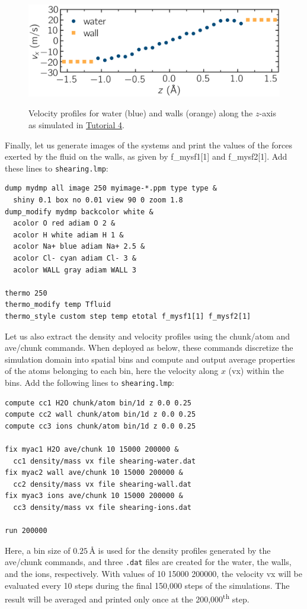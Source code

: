 \documentclass[9pt,tutorial]{livecoms}
\newcommand{\lmpcmd}[1]{\colorbox{listing}{\textcolor{command}{\small{#1}}}} %
\newcommand{\flecmd}[1]{\textcolor{command}{\texttt{#1}}} %
\begin{document}
\begin{figure}
\centering
\includegraphics[width=\linewidth]{NANOSHEAR-profiles}\\[-2ex]
\caption{Velocity profiles for water (blue) and walls (orange) along the $z$-axis as
simulated in \hyperref[sheared-confined-label]{Tutorial 4}.}
\label{fig:NANOSHEAR-profiles}
\end{figure}

Finally, let us generate images of the systems and print the values of the
forces exerted by the fluid on the walls, as given by \lmpcmd{f\_mysf1[1]}
and \lmpcmd{f\_mysf2[1]}.  Add these lines to \flecmd{shearing.lmp}:
\begin{lstlisting}
dump mydmp all image 250 myimage-*.ppm type type &
  shiny 0.1 box no 0.01 view 90 0 zoom 1.8
dump_modify mydmp backcolor white &
  acolor O red adiam O 2 &
  acolor H white adiam H 1 &
  acolor Na+ blue adiam Na+ 2.5 &
  acolor Cl- cyan adiam Cl- 3 &
  acolor WALL gray adiam WALL 3

thermo 250
thermo_modify temp Tfluid
thermo_style custom step temp etotal f_mysf1[1] f_mysf2[1]
\end{lstlisting}
Let us also extract the density and velocity profiles using
the \lmpcmd{chunk/atom} and \lmpcmd{ave/chunk} commands.  When deployed as below, these
commands discretize the simulation domain into spatial bins and compute and output
average properties of the atoms belonging to each bin, here the velocity
along $x$ (\lmpcmd{vx}) within the bins.  Add the following lines to \flecmd{shearing.lmp}:
\begin{lstlisting}
compute cc1 H2O chunk/atom bin/1d z 0.0 0.25
compute cc2 wall chunk/atom bin/1d z 0.0 0.25
compute cc3 ions chunk/atom bin/1d z 0.0 0.25

fix myac1 H2O ave/chunk 10 15000 200000 &
  cc1 density/mass vx file shearing-water.dat
fix myac2 wall ave/chunk 10 15000 200000 &
  cc2 density/mass vx file shearing-wall.dat
fix myac3 ions ave/chunk 10 15000 200000 &
  cc3 density/mass vx file shearing-ions.dat

run 200000
\end{lstlisting}
Here, a bin size of $0.25\,\text{\AA{}}$ is used for the density
profiles generated by the \lmpcmd{ave/chunk} commands, and three
\flecmd{.dat} files are created for the water, the walls, and the ions,
respectively.  With values of \lmpcmd{10 15000 200000}, the velocity
\lmpcmd{vx} will be evaluated every 10 steps during the final 150,000
steps of the simulations.  The result will be averaged and printed only
once at the 200,000\textsuperscript{th} step.
\end{document}
